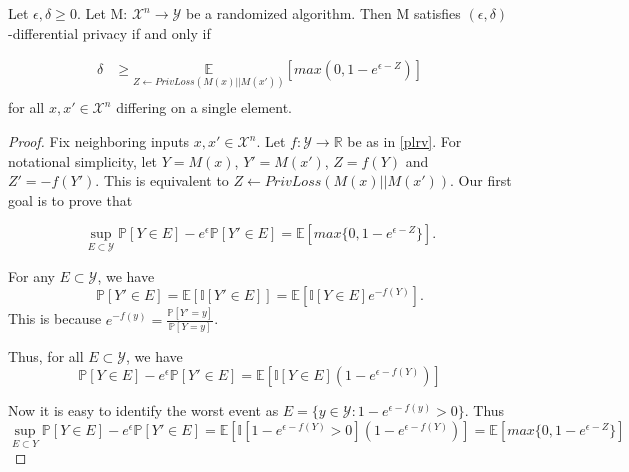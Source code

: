 \documentclass{article}
\begin{document}
\begin{lemma}
\label{delta-bound}
\cite{CKS20} Let $\epsilon, \delta \geq 0$. Let M: $\mathcal{X}^n \rightarrow \mathcal{Y}$ be a randomized algorithm. Then M satisfies $(\epsilon, \delta)$-differential privacy if and only if

\begin{align}
    \delta &\geq \underset{Z \leftarrow PrivLoss(M(x)|| M(x'))}{\mathbb{E}} [max(0, 1 - e^{\epsilon - Z})] \\
\end{align}
for all $x, x' \in \mathcal{X}^n$ differing on a single element.

\begin{proof}
Fix neighboring inputs $x, x' \in \mathcal{X}^n$. 
Let $f: \mathcal{Y} \rightarrow \mathbb{R}$ be as in \ref{plrv}.
For notational simplicity, let $Y = M(x)$, $Y' = M(x')$, $Z = f(Y)$ and $Z' = -f(Y')$.
This is equivalent to $Z \leftarrow PrivLoss(M(x) || M(x'))$.
Our first goal is to prove that

\begin{equation}
    \sup\limits_{E \subset \mathcal{Y}} \mathbb{P}[Y \in E] - e^\epsilon \mathbb{P}[Y' \in E] = \mathbb{E}[max\{0, 1 - e^{\epsilon - Z}\}].
\end{equation}

For any $E \subset \mathcal{Y}$, we have
\begin{equation}
    \mathbb{P}[Y' \in E] = \mathbb{E}[\mathbb{I}[Y' \in E]] = \mathbb{E}[\mathbb{I}[Y \in E] e^{-f(Y)}].
\end{equation}
This is because $e^{-f(y)} = \frac{\mathbb{P}[Y'=y]}{\mathbb{P}[Y=y]}$.

Thus, for all $E \subset \mathcal{Y}$, we have 
\begin{equation}
    \mathbb{P}[Y \in E] - e^\epsilon \mathbb{P}[Y' \in E] = \mathbb{E} \left[ \mathbb{I}[Y \in E] (1 - e^{\epsilon - f(Y)}) \right]
\end{equation}

Now it is easy to identify the worst event as $E = \{y \in \mathcal{Y} : 1 - e^{\epsilon - f(y)} > 0\}$. Thus
\begin{equation}
    \sup\limits_{E \subset Y} \mathbb{P}[Y \in E] - e^{\epsilon} \mathbb{P}[Y' \in E] = \mathbb{E} \left[ \mathbb{I}[1 - e^{\epsilon - f(Y)} > 0] (1 - e^{\epsilon - f(Y)}) \right] = \mathbb{E}[max\{ 0, 1 - e^{\epsilon - Z} \}]
\end{equation}


\end{proof}
\end{lemma}
\end{document}
